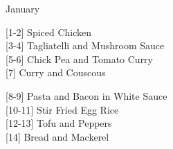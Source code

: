 
    
		\begin{menu}{January}
    
    \begin{recipelist}
    
        {\scriptsize[1-2]} Spiced Chicken\\
        {\scriptsize[3-4]} Tagliatelli and Mushroom Sauce\\
        {\scriptsize[5-6]} Chick Pea and Tomato Curry\\
        {\scriptsize[7]} Curry and Couscous\\%
    \end{recipelist}%
    \begin{recipelist}
    
        {\scriptsize[8-9]} Pasta and Bacon in White Sauce\\
        {\scriptsize[10-11]} Stir Fried Egg Rice\\
        {\scriptsize[12-13]} Tofu and Peppers\\
        {\scriptsize[14]} Bread and Mackerel\\%
    \end{recipelist}\par%
  

\end{menu}
